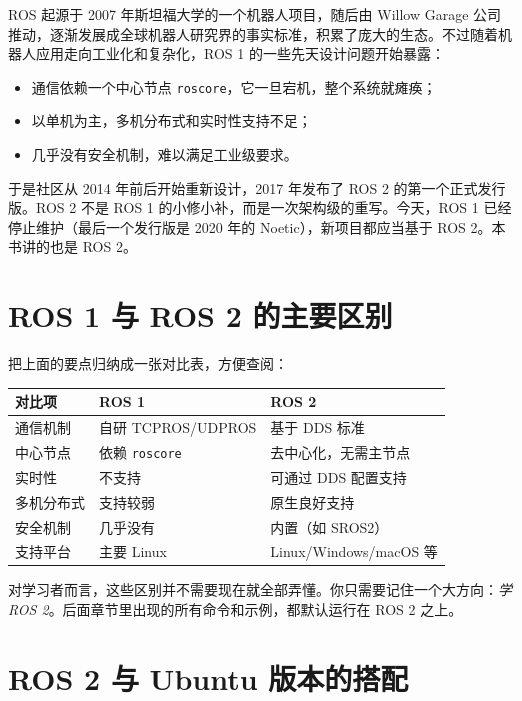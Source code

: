 \documentclass[12pt,a4paper]{ctexbook}
\begin{document}
ROS 起源于 2007 年斯坦福大学的一个机器人项目，随后由 Willow Garage 公司推动，逐渐发展成全球机器人研究界的事实标准，积累了庞大的生态。不过随着机器人应用走向工业化和复杂化，ROS 1 的一些先天设计问题开始暴露：

\begin{itemize}
    \item 通信依赖一个中心节点 \texttt{roscore}，它一旦宕机，整个系统就瘫痪；
    \item 以单机为主，多机分布式和实时性支持不足；
    \item 几乎没有安全机制，难以满足工业级要求。
\end{itemize}

于是社区从 2014 年前后开始重新设计，2017 年发布了 ROS 2 的第一个正式发行版。ROS 2 不是 ROS 1 的小修小补，而是一次架构级的重写。今天，ROS 1 已经停止维护（最后一个发行版是 2020 年的 Noetic），新项目都应当基于 ROS 2。本书讲的也是 ROS 2。

\section{ROS 1 与 ROS 2 的主要区别}

把上面的要点归纳成一张对比表，方便查阅：

\begin{center}
\begin{tabular}{|l|l|l|}
\hline
\textbf{对比项} & \textbf{ROS 1} & \textbf{ROS 2} \\
\hline
通信机制 & 自研 TCPROS/UDPROS & 基于 DDS 标准 \\
中心节点 & 依赖 \texttt{roscore} & 去中心化，无需主节点 \\
实时性 & 不支持 & 可通过 DDS 配置支持 \\
多机分布式 & 支持较弱 & 原生良好支持 \\
安全机制 & 几乎没有 & 内置（如 SROS2） \\
支持平台 & 主要 Linux & Linux/Windows/macOS 等 \\
\hline
\end{tabular}
\end{center}

对学习者而言，这些区别并不需要现在就全部弄懂。你只需要记住一个大方向：\emph{学 ROS 2}。后面章节里出现的所有命令和示例，都默认运行在 ROS 2 之上。

\section{ROS 2 与 Ubuntu 版本的搭配}
\end{document}
